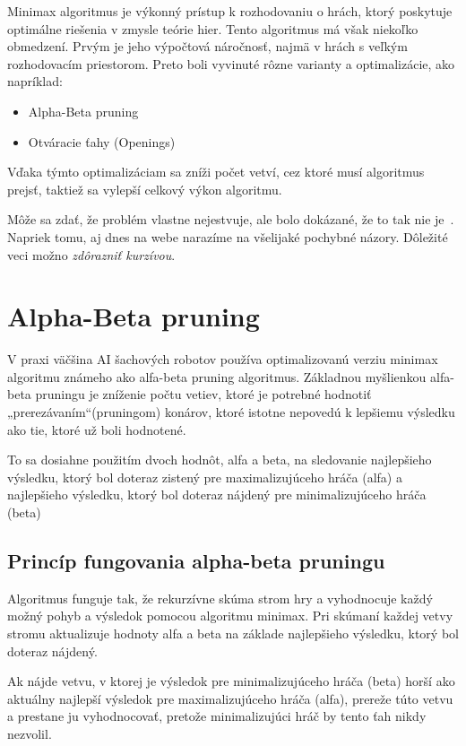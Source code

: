 \documentclass[10pt,twoside,slovak,a4paper]{article}
\begin{document}
Minimax algoritmus je výkonný prístup k rozhodovaniu o hrách, ktorý poskytuje optimálne riešenia v zmysle teórie hier. Tento algoritmus má však niekoľko obmedzení. Prvým je jeho výpočtová náročnosť, najmä v hrách s veľkým rozhodovacím priestorom. Preto boli vyvinuté rôzne varianty a optimalizácie, ako napríklad:
\begin{itemize}
\item Alpha-Beta pruning
\item Otváracie ťahy (Openings)
\end{itemize}
Vďaka týmto optimalizáciam sa zníži počet vetví, cez ktoré musí algoritmus prejsť, taktiež sa vylepší celkový výkon algoritmu. 


Môže sa zdať, že problém vlastne nejestvuje\cite{Coplien:MPD}, ale bolo dokázané, že to tak nie je~\cite{Czarnecki:Staged, Czarnecki:Progress}. Napriek tomu, aj dnes na webe narazíme na všelijaké pochybné názory\cite{PLP-Framework}. Dôležité veci možno \emph{zdôrazniť kurzívou}.


\section{Alpha-Beta pruning} \label{alpha-beta}
V praxi väčšina AI šachových robotov používa optimalizovanú verziu minimax algoritmu známeho ako alfa-beta pruning algoritmus. Základnou myšlienkou alfa-beta pruningu je zníženie počtu vetiev, ktoré je potrebné hodnotiť „prerezávaním“(pruningom) konárov, ktoré istotne nepovedú k lepšiemu výsledku ako tie, ktoré už boli hodnotené. 

To sa dosiahne použitím dvoch hodnôt, alfa a beta, na sledovanie najlepšieho výsledku, ktorý bol doteraz zistený pre maximalizujúceho hráča (alfa) a najlepšieho výsledku, ktorý bol doteraz nájdený pre minimalizujúceho hráča (beta)

\subsection{Princíp fungovania alpha-beta pruningu} \label{principAlpha-beta}
Algoritmus funguje tak, že rekurzívne skúma strom hry a vyhodnocuje každý možný pohyb a výsledok pomocou algoritmu minimax. Pri skúmaní každej vetvy stromu aktualizuje hodnoty alfa a beta na základe najlepšieho výsledku, ktorý bol doteraz nájdený. 

Ak nájde vetvu, v ktorej je výsledok pre minimalizujúceho hráča (beta) horší ako aktuálny najlepší výsledok pre maximalizujúceho hráča (alfa), prereže túto vetvu a prestane ju vyhodnocovať, pretože minimalizujúci hráč by tento ťah nikdy nezvolil. 
\end{document}
